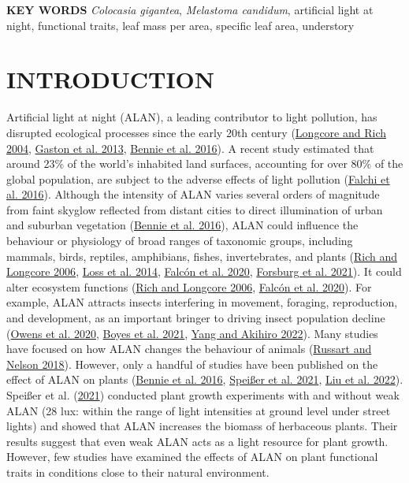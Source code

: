 \documentclass[
  12pt,
  letterpaper,
  DIV=11,
  numbers=noendperiod]{scrartcl}
\begin{document}
\textbf{KEY WORDS} \emph{Colocasia gigantea}, \emph{Melastoma candidum},
artificial light at night, functional traits, leaf mass per area,
specific leaf area, understory

\hypertarget{introduction}{%
\section{INTRODUCTION}\label{introduction}}

Artificial light at night (ALAN), a leading contributor to light
pollution, has disrupted ecological processes since the early 20th
century (\protect\hyperlink{ref-Longcore2004}{Longcore and Rich 2004},
\protect\hyperlink{ref-Gaston2013}{Gaston et al. 2013},
\protect\hyperlink{ref-Bennie2016}{Bennie et al. 2016}). A recent study
estimated that around 23\% of the world's inhabited land surfaces,
accounting for over 80\% of the global population, are subject to the
adverse effects of light pollution
(\protect\hyperlink{ref-Falchi2016a}{Falchi et al. 2016}). Although the
intensity of ALAN varies several orders of magnitude from faint skyglow
reflected from distant cities to direct illumination of urban and
suburban vegetation (\protect\hyperlink{ref-Bennie2016}{Bennie et al.
2016}), ALAN could influence the behaviour or physiology of broad ranges
of taxonomic groups, including mammals, birds, reptiles, amphibians,
fishes, invertebrates, and plants (\protect\hyperlink{ref-Rich2006}{Rich
and Longcore 2006}, \protect\hyperlink{ref-Loss2014}{Loss et al. 2014},
\protect\hyperlink{ref-Falcon2020}{Falcón et al. 2020},
\protect\hyperlink{ref-Forsburg2021}{Forsburg et al. 2021}). It could
alter ecosystem functions (\protect\hyperlink{ref-Rich2006}{Rich and
Longcore 2006}, \protect\hyperlink{ref-Falcon2020}{Falcón et al. 2020}).
For example, ALAN attracts insects interfering in movement, foraging,
reproduction, and development, as an important bringer to driving insect
population decline (\protect\hyperlink{ref-Owens2020}{Owens et al.
2020}, \protect\hyperlink{ref-Boyes2021}{Boyes et al. 2021},
\protect\hyperlink{ref-Yang2022}{Yang and Akihiro 2022}). Many studies
have focused on how ALAN changes the behaviour of animals
(\protect\hyperlink{ref-Russart2018}{Russart and Nelson 2018}). However,
only a handful of studies have been published on the effect of ALAN on
plants (\protect\hyperlink{ref-Bennie2016}{Bennie et al. 2016},
\protect\hyperlink{ref-Speisser2021a}{Speißer et al. 2021},
\protect\hyperlink{ref-Liu2022}{Liu et al. 2022}). Speißer et al.
(\protect\hyperlink{ref-Speisser2021a}{2021}) conducted plant growth
experiments with and without weak ALAN (28 lux: within the range of
light intensities at ground level under street lights) and showed that
ALAN increases the biomass of herbaceous plants. Their results suggest
that even weak ALAN acts as a light resource for plant growth. However,
few studies have examined the effects of ALAN on plant functional traits
in conditions close to their natural environment.
\end{document}
